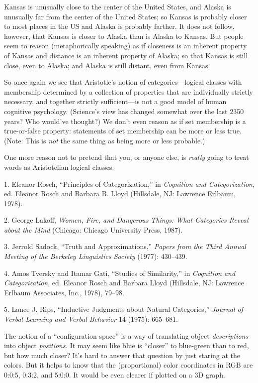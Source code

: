 {
 Kansas is unusually close to the center of the United States, and
Alaska is unusually far from the center of the United States; so Kansas
is probably closer to most places in the US and Alaska is probably
farther. It does not follow, however, that Kansas is closer to Alaska
than is Alaska to Kansas. But people seem to reason (metaphorically
speaking) as if closeness is an inherent property of Kansas and
distance is an inherent property of Alaska; so that Kansas is still
close, even to Alaska; and Alaska is still distant, even from Kansas.}

{
 So once again we see that Aristotle's notion of
categories---logical classes with membership determined by a collection
of properties that are individually strictly necessary, and together
strictly sufficient---is not a good model of human cognitive
psychology. (Science's view has changed somewhat over
the last 2350 years? Who would've thought?) We
don't even reason as if set membership is a
true-or-false property: statements of set membership can be more or
less true. (Note: This is \textit{not} the same thing as being more or
less probable.)}

{
 One more reason not to pretend that you, or anyone else, is
\textit{really} going to treat words as Aristotelian logical classes.}

\myendsectiontext


\bigskip

{
 1. Eleanor Rosch, ``Principles of
Categorization,'' in \textit{Cognition and
Categorization}, ed. Eleanor Rosch and Barbara B. Lloyd (Hillsdale, NJ:
Lawrence Erlbaum, 1978).}

{
 2. George Lakoff, \textit{Women, Fire, and Dangerous Things: What
Categories Reveal about the Mind} (Chicago: Chicago University Press,
1987).}

{
 3. Jerrold Sadock, ``Truth and
Approximations,'' \textit{Papers from the Third
Annual Meeting of the Berkeley Linguistics Society} (1977): 430--439.}

{
 4. Amos Tversky and Itamar Gati, ``Studies of
Similarity,'' in \textit{Cognition and
Categorization}, ed. Eleanor Rosch and Barbara Lloyd (Hillsdale, NJ:
Lawrence Erlbaum Associates, Inc., 1978), 79--98.}

{
 5. Lance J. Rips, ``Inductive Judgments about
Natural Categories,'' \textit{Journal of Verbal
Learning and Verbal Behavior} 14 (1975): 665--681.}


{
 The notion of a ``configuration
space'' is a way of translating object
\textit{descriptions} into object \textit{positions.} It may seem like
blue is ``closer'' to blue-green
than to red, but how much closer? It's hard to answer
that question by just staring at the colors. But it helps to know that
the (proportional) color coordinates in RGB are 0:0:5, 0:3:2, and
5:0:0. It would be even clearer if plotted on a 3D graph.}

